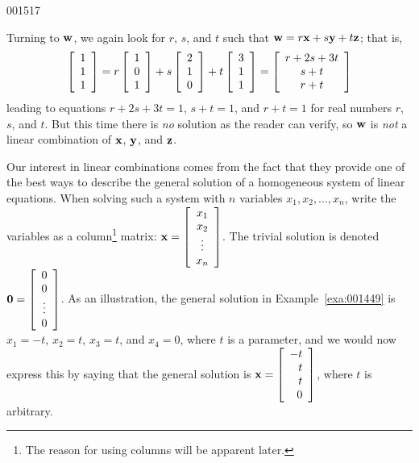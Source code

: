 \begin{example}{}{001517}
\begin{solution}
Turning to $\textbf{w}$, we again look for $r$, $s$, and $t$ such that $\textbf{w} = r\textbf{x} + s\textbf{y} + t\textbf{z}$; that is,
\begin{equation*}
\left[ \begin{array}{r}
	1 \\
	1 \\
	1
\end{array} \right]
= r
\left[ \begin{array}{r}
	1 \\
	0 \\
	1
\end{array} \right]
+ s
\left[ \begin{array}{r}
	2 \\
	1 \\
	0
\end{array} \right]
+ t
\left[ \begin{array}{r}
	3 \\
	1 \\
	1
\end{array} \right]
=
\left[ \begin{array}{c}
	r + 2s + 3t \\
	s + t \\
	r + t
\end{array} \right]
\end{equation*}
leading to equations $r + 2s + 3t = 1$, $s + t = 1$, and $r + t = 1$ for real numbers $r$, $s$, and $t$. But this time there is \textit{no} solution as the reader can verify, so $\textbf{w}$ is \textit{not} a linear combination of $\textbf{x}$, $\textbf{y}$, and $\textbf{z}$.
\end{solution}
\end{example}

Our interest in linear combinations comes from the fact that they provide one of the best ways to describe the general solution of a homogeneous system of linear equations. When 
solving such a system with $n$ variables $x_1, x_2, \dots, x_n$, write the variables as a column\footnote{The reason for using columns will be apparent later.} matrix: $\textbf{x} = \left[
 \begin{array}{c}
	x_1 \\
 	x_2 \\
 	\vdots \\
 	x_n
\end{array} \right]$. The trivial solution is denoted $\textbf{0} = 
\left[ \begin{array}{c}
0 \\
0 \\
\vdots \\
0
\end{array} \right]$. As an illustration, the general solution in
Example~\ref{exa:001449} is $x_1 = -t$, $x_2 = t$, $ x_3 = t$, and $x_4 = 0$, where $t$ is a parameter, and we would now express this by
saying that the general solution is $\textbf{x} = \left[ \begin{array}{r}
	-t \\
	t \\
	t \\
	0
\end{array} \right]$, where $t$ is arbitrary.


